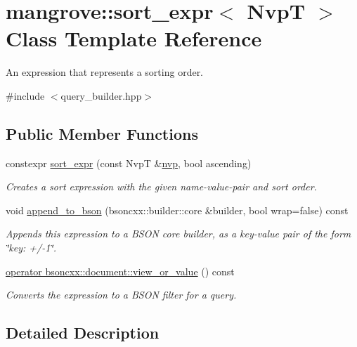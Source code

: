 \hypertarget{classmangrove_1_1sort__expr}{}\section{mangrove\+:\+:sort\+\_\+expr$<$ NvpT $>$ Class Template Reference}
\label{classmangrove_1_1sort__expr}


An expression that represents a sorting order.  




{\ttfamily \#include $<$query\+\_\+builder.\+hpp$>$}

\subsection*{Public Member Functions}
\begin{DoxyCompactItemize}
\item 
constexpr \hyperlink{classmangrove_1_1sort__expr_a532850c29fbdebcd522e27be7ad85da3}{sort\+\_\+expr} (const NvpT \&\hyperlink{classmangrove_1_1nvp}{nvp}, bool ascending)
\begin{DoxyCompactList}\small\item\em Creates a sort expression with the given name-\/value-\/pair and sort order. \end{DoxyCompactList}\item 
void \hyperlink{classmangrove_1_1sort__expr_a22eb8244a5400cb80ac79fb3248abfff}{append\+\_\+to\+\_\+bson} (bsoncxx\+::builder\+::core \&builder, bool wrap=false) const 
\begin{DoxyCompactList}\small\item\em Appends this expression to a B\+S\+ON core builder, as a key-\/value pair of the form \char`\"{}key\+: +/-\/1\char`\"{}. \end{DoxyCompactList}\item 
\hyperlink{classmangrove_1_1sort__expr_a9823eab4a819824e981b5b62f1a9e4c3}{operator bsoncxx\+::document\+::view\+\_\+or\+\_\+value} () const 
\begin{DoxyCompactList}\small\item\em Converts the expression to a B\+S\+ON filter for a query. \end{DoxyCompactList}\end{DoxyCompactItemize}


\subsection{Detailed Description}
